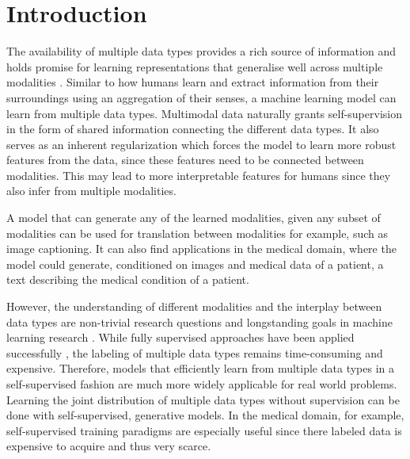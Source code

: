 \chapter{Introduction}
The availability of multiple data types provides a rich source of information and holds promise for learning representations that generalise well across multiple modalities \citep{baltrusaitis_multimodal_2019}.
Similar to how humans learn and extract information from their surroundings using an aggregation of their senses, a machine learning model can learn from multiple data types.
Multimodal data naturally grants self-supervision in the form of shared information connecting the different data types.
It also serves as an inherent regularization which forces the model to learn more robust features from the data, since these features need to be connected between modalities.
This may lead to more interpretable features for humans since they also infer from multiple modalities.

A model that can generate any of the learned modalities, given any subset of modalities can be used for translation between modalities for example, such as image captioning.
It can also find applications in the medical domain, where the model could generate, conditioned on images and medical data of a patient, a text describing the medical condition of a patient.

However, the understanding of different modalities and the interplay between data types are non-trivial research questions and longstanding goals in machine learning research \citep{ngiam_multimodal_nodate}.
While fully supervised approaches have been applied successfully \citep{karpathy_deep_2015,tsai_learning_2018}, the labeling of multiple data types remains time-consuming and expensive.
Therefore, models that efficiently learn from multiple data types in a self-supervised fashion are much more widely applicable for real world problems.
Learning the joint distribution of multiple data types without supervision can be done with self-supervised, generative models.
In the medical domain, for example, self-supervised training paradigms are especially useful since there labeled data is expensive to acquire and thus very scarce.

